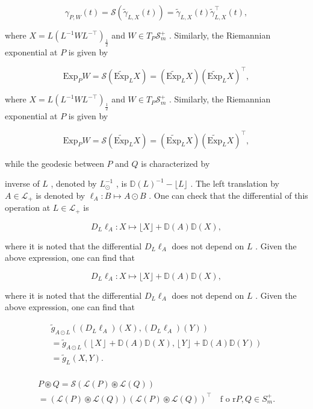 \documentclass[11pt]{article}
\begin{document}
$$
\gamma_ {P, W} (t) = \mathcal {S} (\tilde {\gamma} _ {L, X} (t)) = \tilde {\gamma} _ {L, X} (t) \tilde {\gamma} _ {L, X} ^ {\top} (t),
$$

where  $X = L(L^{-1}WL^{-\top})_{\frac{1}{2}}$  and  $W \in T_P\mathcal{S}_m^+$ . Similarly, the Riemannian exponential at  $P$  is given by

$$
\mathrm {E x p} _ {P} W = \mathcal {S} (\widetilde {\mathrm {E x p}} _ {L} X) = (\widetilde {\mathrm {E x p}} _ {L} X) (\widetilde {\mathrm {E x p}} _ {L} X) ^ {\top},
$$

where  $X = L(L^{-1}WL^{-\top})_{\frac{1}{2}}$  and  $W \in T_P\mathcal{S}_m^+$ . Similarly, the Riemannian exponential at  $P$  is given by

$$
\mathrm {E x p} _ {P} W = \mathcal {S} (\widetilde {\mathrm {E x p}} _ {L} X) = (\widetilde {\mathrm {E x p}} _ {L} X) (\widetilde {\mathrm {E x p}} _ {L} X) ^ {\top},
$$

while the geodesic between  $P$  and  $Q$  is characterized by

inverse of  $L$ , denoted by  $L_{\odot}^{-1}$ , is  $\mathbb{D}(L)^{-1} - \lfloor L\rfloor$ . The left translation by  $A\in \mathcal{L}_{+}$  is denoted by  $\ell_A:B\mapsto A\odot B$ . One can check that the differential of this operation at  $L\in \mathcal{L}_{+}$  is

$$
D _ {L} \ell_ {A}: X \mapsto \lfloor X \rfloor + \mathbb {D} (A) \mathbb {D} (X), \tag {3.2}
$$

where it is noted that the differential  $D_{L}\ell_{A}$  does not depend on  $L$ . Given the above expression, one can find that

$$
D _ {L} \ell_ {A}: X \mapsto \lfloor X \rfloor + \mathbb {D} (A) \mathbb {D} (X), \tag {3.2}
$$

where it is noted that the differential  $D_{L}\ell_{A}$  does not depend on  $L$ . Given the above expression, one can find that

$$
\begin{array}{l} \tilde {g} _ {A \odot L} ((D _ {L} \ell_ {A}) (X), (D _ {L} \ell_ {A}) (Y)) \\ = \tilde {g} _ {A \odot L} (\left\lfloor X \right\rfloor + \mathbb {D} (A) \mathbb {D} (X), \left\lfloor Y \right\rfloor + \mathbb {D} (A) \mathbb {D} (Y)) \\ = \tilde {g} _ {L} (X, Y). \\ \end{array}
$$

$$
\begin{array}{l} P \circledast Q = \mathcal {S} (\mathcal {L} (P) \circledast \mathcal {L} (Q)) \\ = \left(\mathcal {L} (P) \circledast \mathcal {L} (Q)\right) \left(\mathcal {L} (P) \circledast \mathcal {L} (Q)\right) ^ {\top} \quad \text {f o r} P, Q \in S _ {m} ^ {+}. \\ \end{array}
$$
\end{document}
